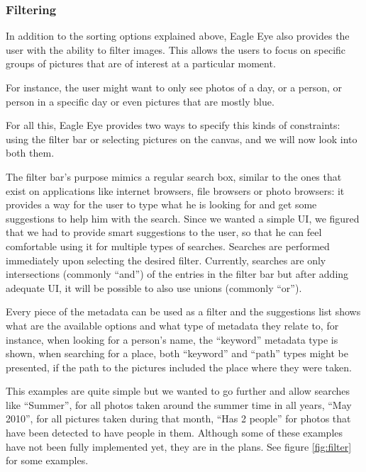 \subsubsection{Filtering} %
\label{ss:filtering}

In addition to the sorting options explained above, Eagle Eye also provides the user with the ability to filter images. This allows the users to focus on specific groups of pictures that are of interest at a particular moment.

For instance, the user might want to only see photos of a day, or a person, or person in a specific day or even pictures that are mostly blue.

For all this, Eagle Eye provides two ways to specify this kinds of constraints: using the filter bar or selecting pictures on the canvas, and we will now look into both them.

The filter bar's purpose mimics a regular search box, similar to the ones that exist on applications like internet browsers, file browsers or photo browsers: it provides a way for the user to type what he is looking for and get some suggestions to help him with the search. Since we wanted a simple \ac{UI}, we figured that we had to provide smart suggestions to the user, so that he can feel comfortable using it for multiple types of searches. Searches are performed immediately upon selecting the desired filter. Currently, searches are only intersections (commonly ``and'') of the entries in the filter bar but after adding adequate \ac{UI}, it will be possible to also use unions (commonly ``or'').

Every piece of the metadata can be used as a filter and the suggestions list shows what are the available options and what type of metadata they relate to, for instance, when looking for a person's name, the ``keyword'' metadata type is shown, when searching for a place, both ``keyword'' and ``path'' types might be presented, if the path to the pictures included the place where they were taken.

This examples are quite simple but we wanted to go further and allow searches like ``Summer'', for all photos taken around the summer time in all years, ``May 2010'', for all pictures taken during that month, ``Has 2 people'' for photos that have been detected to have people in them. Although some of these examples have not been fully implemented yet, they are in the plans. See figure \ref{fig:filter} for some examples.

